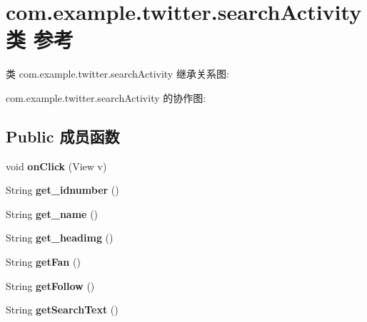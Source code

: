 \hypertarget{classcom_1_1example_1_1twitter_1_1search_activity}{}\section{com.\+example.\+twitter.\+search\+Activity类 参考}
\label{classcom_1_1example_1_1twitter_1_1search_activity}


类 com.\+example.\+twitter.\+search\+Activity 继承关系图\+:


com.\+example.\+twitter.\+search\+Activity 的协作图\+:
\subsection*{Public 成员函数}
\begin{DoxyCompactItemize}
\item 
\mbox{\label{classcom_1_1example_1_1twitter_1_1search_activity_a44447bd5959713775b9f5682e01a6db9}} 
void {\bfseries on\+Click} (View v)
\item 
\mbox{\label{classcom_1_1example_1_1twitter_1_1search_activity_ad91cbe31d2501fea137acf170934fa35}} 
String {\bfseries get\+\_\+idnumber} ()
\item 
\mbox{\label{classcom_1_1example_1_1twitter_1_1search_activity_ad454022b7c768e399641b6ef642bcc30}} 
String {\bfseries get\+\_\+name} ()
\item 
\mbox{\label{classcom_1_1example_1_1twitter_1_1search_activity_ab37f89cb86aa0645d9b8d0e0bfbd0624}} 
String {\bfseries get\+\_\+headimg} ()
\item 
\mbox{\label{classcom_1_1example_1_1twitter_1_1search_activity_afb4ae61f36ac0702146ede079f6fea1b}} 
String {\bfseries get\+Fan} ()
\item 
\mbox{\label{classcom_1_1example_1_1twitter_1_1search_activity_a2fc1d28e9931ea6cd8b3dc5183d93138}} 
String {\bfseries get\+Follow} ()
\item 
\mbox{\label{classcom_1_1example_1_1twitter_1_1search_activity_ac8d1db8f10c0bcd7f7ec1bc9d3691085}} 
String {\bfseries get\+Search\+Text} ()
\end{DoxyCompactItemize}
